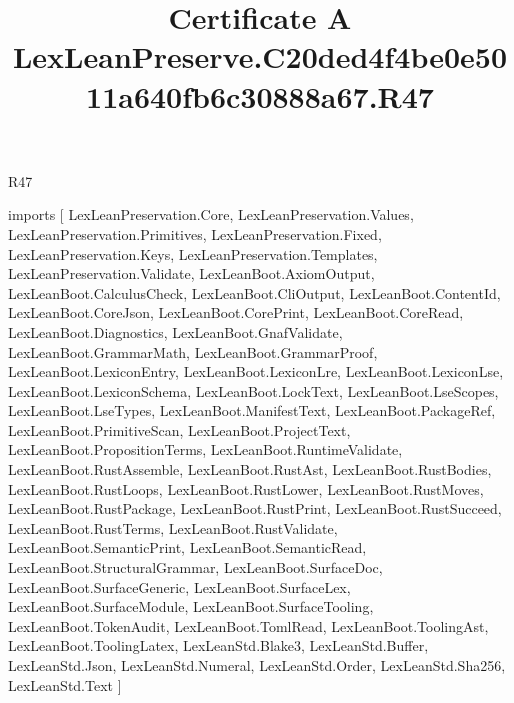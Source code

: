 \begin{lexlean}{R47}
\title{Certificate A LexLeanPreserve.C20ded4f4be0e5011a640fb6c30888a67.R47}
\begin{coremodule}
imports [
  LexLeanPreservation.Core,
  LexLeanPreservation.Values,
  LexLeanPreservation.Primitives,
  LexLeanPreservation.Fixed,
  LexLeanPreservation.Keys,
  LexLeanPreservation.Templates,
  LexLeanPreservation.Validate,
  LexLeanBoot.AxiomOutput,
  LexLeanBoot.CalculusCheck,
  LexLeanBoot.CliOutput,
  LexLeanBoot.ContentId,
  LexLeanBoot.CoreJson,
  LexLeanBoot.CorePrint,
  LexLeanBoot.CoreRead,
  LexLeanBoot.Diagnostics,
  LexLeanBoot.GnafValidate,
  LexLeanBoot.GrammarMath,
  LexLeanBoot.GrammarProof,
  LexLeanBoot.LexiconEntry,
  LexLeanBoot.LexiconLre,
  LexLeanBoot.LexiconLse,
  LexLeanBoot.LexiconSchema,
  LexLeanBoot.LockText,
  LexLeanBoot.LseScopes,
  LexLeanBoot.LseTypes,
  LexLeanBoot.ManifestText,
  LexLeanBoot.PackageRef,
  LexLeanBoot.PrimitiveScan,
  LexLeanBoot.ProjectText,
  LexLeanBoot.PropositionTerms,
  LexLeanBoot.RuntimeValidate,
  LexLeanBoot.RustAssemble,
  LexLeanBoot.RustAst,
  LexLeanBoot.RustBodies,
  LexLeanBoot.RustLoops,
  LexLeanBoot.RustLower,
  LexLeanBoot.RustMoves,
  LexLeanBoot.RustPackage,
  LexLeanBoot.RustPrint,
  LexLeanBoot.RustSucceed,
  LexLeanBoot.RustTerms,
  LexLeanBoot.RustValidate,
  LexLeanBoot.SemanticPrint,
  LexLeanBoot.SemanticRead,
  LexLeanBoot.StructuralGrammar,
  LexLeanBoot.SurfaceDoc,
  LexLeanBoot.SurfaceGeneric,
  LexLeanBoot.SurfaceLex,
  LexLeanBoot.SurfaceModule,
  LexLeanBoot.SurfaceTooling,
  LexLeanBoot.TokenAudit,
  LexLeanBoot.TomlRead,
  LexLeanBoot.ToolingAst,
  LexLeanBoot.ToolingLatex,
  LexLeanStd.Blake3,
  LexLeanStd.Buffer,
  LexLeanStd.Json,
  LexLeanStd.Numeral,
  LexLeanStd.Order,
  LexLeanStd.Sha256,
  LexLeanStd.Text
]


\end{coremodule}
\end{lexlean}
